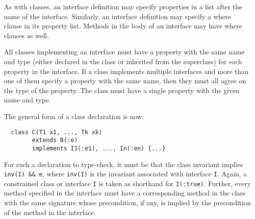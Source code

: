 As with classes, an interface definition may specify properties
in a 
list after the name of the interface. Similarly, an interface
definition may specify a where clause in its property list. Methods
in the body of an interface may have where clauses
as well.

All classes implementing an interface must have a property
with the same name and
type (either declared in the class or inherited from the superclass)
for each property in the interface. If a class implements
multiple interfaces and more than one of them specify a property
with the same name, then they must all agree on the type of the
property. The class must have a single property with the given name
and type.

The general form of a class declaration is now:
\begin{verbatim}
  class C(T1 x1, ..., Tk xk)
        extends B(:e)
        implements I1(:e1), ..., In(:en) {...}
\end{verbatim}
\noindent
For such a
declaration to type-check, it must be that the class invariant
implies {\tt inv(I) \&\& e}, where {\tt inv(I)} is the invariant associated with
interface {\tt I}.  Again, a constrained class or interface {\tt I} is taken as
shorthand for {\tt I(:true)}.  Further, every method specified in the
interface must have a corresponding method in the class with the same
signature whose precondition, if any, is implied by the precondition
of the method in the interface.



